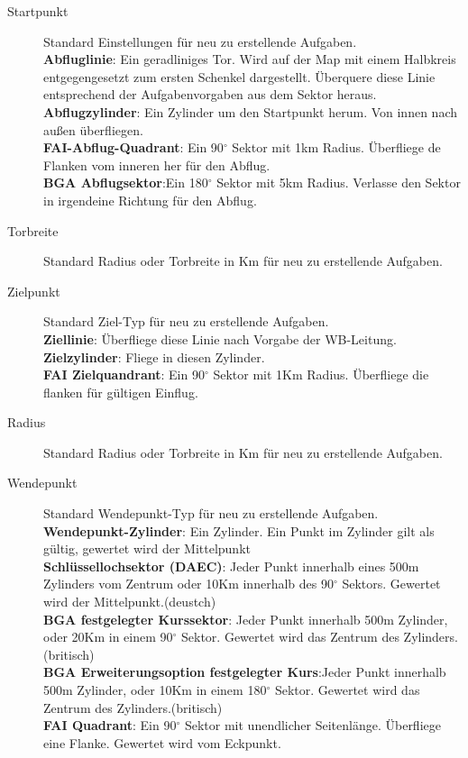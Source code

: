 \begin{description}
\item[Startpunkt] Standard Einstellungen für neu zu erstellende Aufgaben.\\
{\bf  Abfluglinie}: Ein geradliniges Tor. Wird auf der Map mit einem Halbkreis entgegengesetzt zum ersten Schenkel
dargestellt. Überquere diese Linie entsprechend der Aufgabenvorgaben aus dem Sektor heraus.\\
{\bf  Abflugzylinder}: Ein Zylinder um den Startpunkt herum. Von innen nach außen überfliegen.\\
{\bf FAI-Abflug-Quadrant}: Ein 90$^\circ$ Sektor mit 1km Radius. Überfliege de Flanken vom inneren her für den Abflug.\\
{\bf  BGA Abflugsektor}:Ein 180$^\circ$ Sektor mit 5km Radius. Verlasse den Sektor in irgendeine Richtung für den Abflug.
\item[Torbreite] Standard Radius oder Torbreite in Km für neu zu erstellende Aufgaben.
\item[Zielpunkt] Standard Ziel-Typ für neu zu erstellende Aufgaben.\\
{\bf Ziellinie}: Überfliege diese Linie nach Vorgabe der WB-Leitung.\\
{\bf Zielzylinder}: Fliege in diesen Zylinder.\\
{\bf FAI Zielquandrant}: Ein 90$^\circ$ Sektor mit 1Km Radius. Überfliege die flanken für gültigen Einflug.
\item[Radius] Standard Radius oder Torbreite in Km für neu zu erstellende Aufgaben.
\item[Wendepunkt] Standard Wendepunkt-Typ für neu zu erstellende Aufgaben.\\
{\bf Wendepunkt-Zylinder}: Ein Zylinder. Ein Punkt im Zylinder gilt als gültig, gewertet wird der Mittelpunkt\\
{\bf Schlüssellochsektor (DAEC)}: Jeder Punkt innerhalb eines 500m Zylinders vom Zentrum oder 10Km innerhalb
des 90$^\circ$ Sektors. Gewertet wird der Mittelpunkt.(deustch)\\
{\bf BGA festgelegter Kurssektor}: Jeder Punkt innerhalb 500m Zylinder, oder 20Km  in einem 90$^\circ$ Sektor.
Gewertet wird das Zentrum des Zylinders.(britisch)\\
{\bf BGA Erweiterungsoption festgelegter Kurs}:Jeder Punkt innerhalb 500m Zylinder, oder 10Km  in einem 180$^\circ$ Sektor.
Gewertet wird das Zentrum des Zylinders.(britisch)\\
{\bf FAI Quadrant}: Ein 90$^\circ$ Sektor mit unendlicher Seitenlänge. Überfliege eine Flanke. Gewertet wird vom Eckpunkt.

\end{description}
